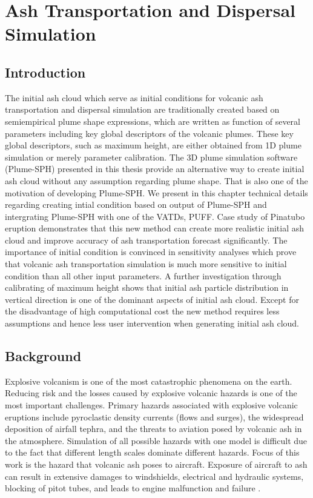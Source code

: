 \chapter{Ash Transportation and Dispersal Simulation} \label{chapter:ash-transportation}

\section{Introduction}

The initial ash cloud which serve as initial conditions for volcanic ash transportation and dispersal simulation are traditionally created based on semiempirical plume shape expressions, which are written as function of several parameters including key global descriptors of the volcanic plumes. These key global descriptors, such as maximum height, are either obtained from 1D plume simulation or merely parameter calibration. The 3D plume simulation software (Plume-SPH) presented in this thesis provide an alternative way to create initial ash cloud without any assumption regarding plume shape. That is also one of the motivation of developing Plume-SPH. 
We present in this chapter technical details regarding creating intial condition based on output of Plume-SPH and intergrating Plume-SPH with one of the VATDs, PUFF. Case study of Pinatubo eruption demonstrates that this new method can create more realistic initial ash cloud and improve accuracy of ash transportation forecast significantly. The importance of initial condition is convinced in sensitivity analyses which prove that volcanic ash transportation simulation is much more sensitive to initial condition than all other input parameters. A further investigation through calibrating of maximum height shows that initial ash particle distribution in vertical direction is one of the dominant aspects of initial ash cloud.
Except for the disadvantage of high computational cost the new method requires less assumptions and hence less user intervention when generating initial ash cloud. 

\section{Background}
Explosive volcanism is one of the most catastrophic
phenomena on the earth.
Reducing risk and the losses caused by explosive volcanic hazards is one of the most important challenges.
Primary hazards associated with explosive volcanic eruptions include pyroclastic density currents (flows and surges), the widespread deposition of airfall tephra, and the threats to aviation posed by volcanic ash in the atmosphere. Simulation of all possible hazards with one model is difficult due to the fact that different length scales dominate different hazards. Focus of this work is the hazard that volcanic ash poses to aircraft. Exposure of
aircraft to ash can result in extensive damages to windshields,
electrical and hydraulic systems, blocking of pitot tubes, and
leads to engine malfunction and failure \citep{peterson2008forecasting}.

